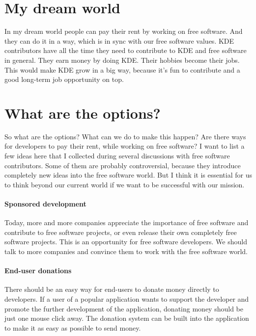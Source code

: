 \section*{My dream world}

In my dream world people can pay their rent by working on free software. And they can do it in a way, which is in sync with our free software values. KDE contributors have all the time they need to contribute to KDE and free software in general. They earn money by doing KDE. Their hobbies become their jobs. This would make KDE grow in a big way, because it's fun to contribute and a good long-term job opportunity on top.  

\section*{What are the options?}

So what are the options? What can we do to make this happen? Are there ways for developers to pay their rent, while working on free software? I want to list a few ideas here that I collected during several discussions with free software contributors. Some of them are probably controversial, because they introduce completely new ideas into the free software world. But I think it is essential for us to think beyond our current world if we want to be successful with our mission.  

\paragraph*{Sponsored development}

Today, more and more companies appreciate the importance of free software  and contribute to free software projects, or even release their own completely free software projects. This is an opportunity for free software developers. We should talk to more companies and convince them to work with the free software world. 

\paragraph*{End-user donations}

There should be an easy way for end-users to donate money directly to developers. If a user of a popular application wants to support the developer and promote the further development  of the application, donating money should be just one mouse click away. The donation system can be built into the application to make it as easy as possible to send money.

